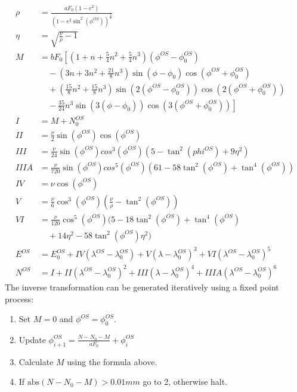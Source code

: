 \documentclass[letterpaper,10pt,english]{sphinxmanual}
\begin{document}
\begin{equation*}
\begin{split}\rho &= \frac{aF_0(1-e^2)}{\left(1-e^2\sin^2(\phi^{OS})\right)^{\frac{3}{2}}} \\
\eta &= \sqrt{\frac{\nu}{\rho}-1} \\
M &= bF_0\left[\left(1+n+\frac{5}{4}n^2+\frac{5}{4}n^3\right)(\phi^{OS}-\phi^{OS}_0)\right. \\
&\quad-\left(3n+3n^2+\frac{21}{8}n^3\right)\sin(\phi-\phi_0)\cos(\phi^{OS}+\phi^{OS}_0) \\
&\quad+\left(\frac{15}{8}n^2+\frac{15}{8}n^3\right)\sin(2(\phi^{OS}-\phi^{OS}_0))\cos(2(\phi^{OS}+\phi^{OS}_0)) \\
&\left.\quad-\frac{35}{24}n^3\sin(3(\phi-\phi_0))\cos(3(\phi^{OS}+\phi^{OS}_0))\right] \\
I &= M + N^{OS}_0 \\
II &= \frac{\nu}{2}\sin(\phi^{OS})\cos(\phi^{OS}) \\
III &= \frac{\nu}{24}\sin(\phi^{OS})cos^3(\phi^{OS})(5-\tan^2(phi^{OS})+9\eta^2) \\
IIIA &= \frac{\nu}{720}\sin(\phi^{OS})cos^5(\phi^{OS})(61-58\tan^2(\phi^{OS})+\tan^4(\phi^{OS})) \\
IV &= \nu\cos(\phi^{OS}) \\
V &= \frac{\nu}{6}\cos^3(\phi^{OS})\left(\frac{\nu}{\rho}-\tan^2(\phi^{OS})\right) \\
VI &= \frac{\nu}{120}\cos^5(\phi^{OS})(5-18\tan^2(\phi^{OS})+\tan^4(\phi^{OS}) \\
&\quad+14\eta^2-58\tan^2(\phi^{OS})\eta^2) \\
E^{OS} &= E^{OS}_0+IV(\lambda^{OS}-\lambda^{OS}_0)+V(\lambda-\lambda^{OS}_0)^3+VI(\lambda^{OS}-\lambda^{OS}_0)^5 \\
N^{OS} &= I + II(\lambda^{OS}-\lambda^{OS}_0)^2+III(\lambda-\lambda^{OS}_0)^4+IIIA(\lambda^{OS}-\lambda^{OS}_0)^6\end{split}
\end{equation*}
\sphinxAtStartPar
The inverse transformation can be generated iteratively using a fixed point process:
\begin{enumerate}
%
\item {} 
\sphinxAtStartPar
Set \(M=0\) and \(\phi^{OS} = \phi_0^{OS}\).

\item {} 
\sphinxAtStartPar
Update \(\phi_{i+1}^{OS} = \frac{N-N_0-M}{aF_0}+\phi_i^{OS}\)

\item {} 
\sphinxAtStartPar
Calculate \(M\) using the formula above.

\item {} 
\sphinxAtStartPar
If \(\textrm{abs}(N-N_0-M)> 0.01 mm\) go to 2, otherwise halt.

\end{enumerate}
\end{document}
